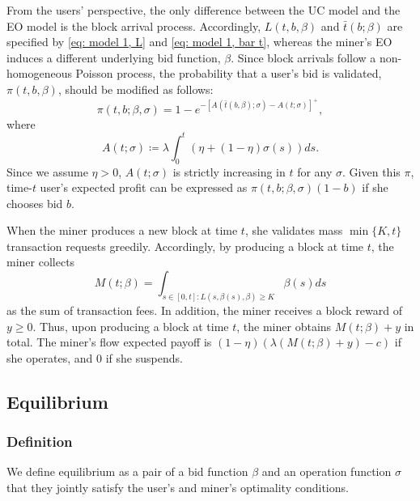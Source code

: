 \documentclass[12pt, letterpaper]{article}
\begin{document}
From the users' perspective, the only difference between the UC model and the EO model is the block arrival process. Accordingly, $L(t, b, \beta)$ and $\bar{t}(b; \beta)$ are specified by \eqref{eq: model 1, L} and \eqref{eq: model 1, bar t}, whereas the miner's EO induces a different underlying bid function, $\beta$. Since block arrivals follow a non-homogeneous Poisson process, the probability that a user's bid is validated, $\pi(t, b, \beta)$, should be modified as follows:
\begin{equation}\label{eq: model 2, pi}
    \pi(t, b; \beta, \sigma) = 1 - e^{- [A(\bar{t}(b, \beta); \sigma) - A(t; \sigma)]^+},
\end{equation}
where
\begin{equation}
    A(t; \sigma) \coloneqq \lambda\int_0^t (\eta + (1 - \eta) \sigma(s)) ds.
\end{equation}
Since we assume $\eta > 0$, $A(t;\sigma)$ is strictly increasing in $t$ for any $\sigma$.
Given this $\pi$, time-$t$ user's expected profit can be expressed as $\pi(t, b; \beta, \sigma) (1 - b)$ if she chooses bid $b$.


When the miner produces a new block at time $t$, she validates mass $\min\{K, t\}$ transaction requests greedily. Accordingly, by producing a block at time $t$, the miner collects
\begin{equation}
    M(t; \beta) = \int_{s \in [0, t]: L(s, \beta(s), \beta) \ge K} \beta(s) ds
\end{equation}
as the sum of transaction fees. In addition, the miner receives a block reward of $y \ge 0$. Thus, upon producing a block at time $t$, the miner obtains $M(t; \beta) + y$ in total. 
The miner's flow expected payoff is $(1 - \eta) (\lambda (M(t; \beta) + y) - c)$ if she operates, and $0$ if she suspends.


\subsection{Equilibrium}

\subsubsection{Definition}

We define equilibrium as a pair of a bid function $\beta$ and an operation function $\sigma$ that 
they jointly satisfy the user's and miner's optimality conditions.
\end{document}
